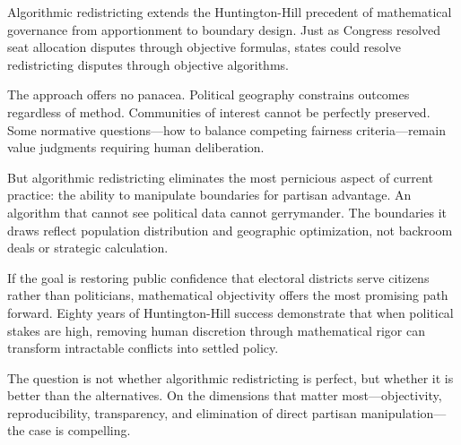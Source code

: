 Algorithmic redistricting extends the Huntington-Hill precedent of mathematical governance from apportionment to boundary design. Just as Congress resolved seat allocation disputes through objective formulas, states could resolve redistricting disputes through objective algorithms.

The approach offers no panacea. Political geography constrains outcomes regardless of method. Communities of interest cannot be perfectly preserved. Some normative questions—how to balance competing fairness criteria—remain value judgments requiring human deliberation.

But algorithmic redistricting eliminates the most pernicious aspect of current practice: the ability to manipulate boundaries for partisan advantage. An algorithm that cannot see political data cannot gerrymander. The boundaries it draws reflect population distribution and geographic optimization, not backroom deals or strategic calculation.

If the goal is restoring public confidence that electoral districts serve citizens rather than politicians, mathematical objectivity offers the most promising path forward. Eighty years of Huntington-Hill success demonstrate that when political stakes are high, removing human discretion through mathematical rigor can transform intractable conflicts into settled policy.

The question is not whether algorithmic redistricting is perfect, but whether it is better than the alternatives. On the dimensions that matter most—objectivity, reproducibility, transparency, and elimination of direct partisan manipulation—the case is compelling.
